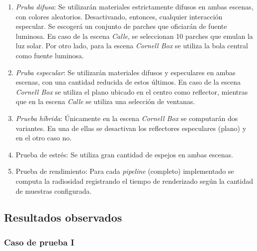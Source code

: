 \begin{enumerate}
	\item \textit{Pruba difusa}: Se utilizarán materiales estrictamente difusos en ambas escenas, con colores aleatorios. Desactivando, entonces, cualquier interacción especular. Se escogerá un conjunto de parches que oficiarán de fuente luminosa. En caso de la escena \textit{Calle}, se seleccionan 10 parches que emulan la luz solar. Por otro lado, para la escena \textit{Cornell Box} se utiliza la bola central como fuente luminosa.
	\item \textit{Pruba especular}: Se utilizarán materiales difusos y especulares en ambas escenas, con una cantidad reducida de estos últimos. En caso de la escena \textit{Cornell Box} se utiliza el plano ubicado en el centro como reflector, mientras que en la escena \textit{Calle} se utiliza una selección de ventanas.
	\item \textit{Prueba híbrida}: Únicamente en la escena \textit{Cornell Box} se computarán dos variantes. En una de ellas se desactivan los reflectores especulares (plano) y en el otro caso no.
	\item{Prueba de estrés}: Se utiliza gran cantidad de espejos en ambas escenas.
	\item{Prueba de rendimiento}: Para cada \textit{pipeline} (completo) implementado se computa la radiosidad registrando el tiempo de renderizado según la cantidad de muestras configurada.
\end{enumerate}

\subsection{Resultados observados}

\subsubsection{Caso de prueba I}

